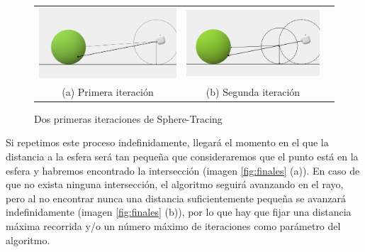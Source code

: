 \begin{figure}[ht]
    \centering
    \begin{tabular}{ccc}
      \includegraphics[scale=0.16]{img/C8/sphere-tracing-1.png} &     \includegraphics[scale=0.196]{img/C8/sphere-tracing-2.png} \\
    (a) Primera iteración & (b) Segunda iteración \\[6pt]
    \end{tabular}
    \caption{Dos primeras iteraciones de Sphere-Tracing}
    \label{fig:iteraciones-ST}
\end{figure}

Si repetimos este proceso indefinidamente, llegará el momento en el que la distancia a la esfera será tan pequeña que consideraremos que el punto está en la esfera y habremos encontrado la intersección (imagen \ref{fig:finales} (a)). En caso de que no exista ninguna intersección, el algoritmo seguirá avanzando en el rayo, pero al no encontrar nunca una distancia suficientemente pequeña se avanzará indefinidamente (imagen \ref{fig:finales} (b)), por lo que hay que fijar una distancia máxima recorrida y/o un número máximo de iteraciones como parámetro del algoritmo.

